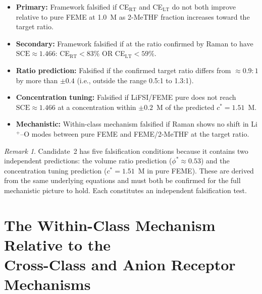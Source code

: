 \documentclass[11pt]{article}
\theoremstyle{plain}
\theoremstyle{definition}
\theoremstyle{remark}
\newtheorem{remark}{Remark}[section]
\begin{document}
\begin{itemize}[leftmargin=2em]
  \item \textbf{Primary:} Framework falsified if CE$_\mathrm{RT}$
        and CE$_\mathrm{LT}$ do not both improve relative to pure
        FEME at 1.0~M as 2-MeTHF fraction increases toward the
        target ratio.
  \item \textbf{Secondary:} Framework falsified if at the ratio
        confirmed by Raman to have $\mathrm{SCE} \approx 1.466$:
        CE$_\mathrm{RT} < 83\%$ OR CE$_\mathrm{LT} < 59\%$.
  \item \textbf{Ratio prediction:} Falsified if the confirmed
        target ratio differs from $\approx 0.9:1$ by more than
        $\pm 0.4$ (i.e., outside the range 0.5:1 to 1.3:1).
  \item \textbf{Concentration tuning:} Falsified if LiFSI/FEME
        pure does not reach $\mathrm{SCE} \approx 1.466$ at a
        concentration within $\pm 0.2$~M of the predicted
        $c^{*} = 1.51$~M.
  \item \textbf{Mechanistic:} Within-class mechanism falsified if
        Raman shows no shift in Li$^+$--O modes between pure FEME
        and FEME/2-MeTHF at the target ratio.
\end{itemize}

\begin{remark}
Candidate~2 has five falsification conditions because it contains
two independent predictions: the volume ratio prediction
($\phi^{*} \approx 0.53$) and the concentration tuning prediction
($c^{*} = 1.51$~M in pure FEME).  These are derived from the same
underlying equations and must both be confirmed for the full
mechanistic picture to hold.  Each constitutes an independent
falsification test.
\end{remark}

\section{The Within-Class Mechanism Relative to the\\
Cross-Class and Anion Receptor Mechanisms}
\label{sec:mechanism_comparison}
\end{document}
